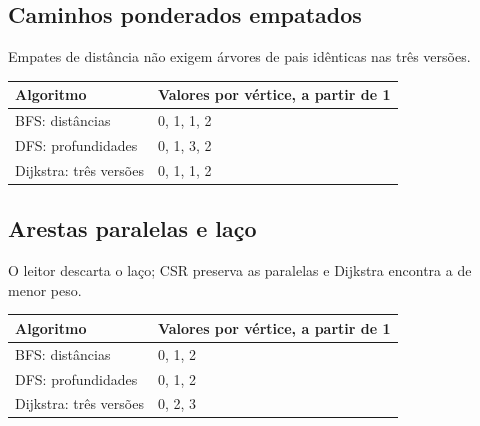 \documentclass[a4paper,12pt]{article}
\begin{document}
\par\noindent\begin{minipage}{\textwidth}\subsection{Caminhos ponderados empatados}
Empates de distância não exigem árvores de pais idênticas nas três versões.
\par\smallskip\noindent\begin{minipage}{\textwidth}\centering
\begingroup\small
\setlength{\tabcolsep}{4pt}
\begin{tabular}{l>{\raggedright\arraybackslash}p{10.4cm}}
\toprule
Algoritmo & Valores por vértice, a partir de 1 \\
\midrule
BFS: distâncias & \num{0}, \num{1}, \num{1}, \num{2} \\
DFS: profundidades & \num{0}, \num{1}, \num{3}, \num{2} \\
Dijkstra: três versões & \num{0}, \num{1}, \num{1}, \num{2} \\
\bottomrule
\end{tabular}
\endgroup
\end{minipage}\par\smallskip
\end{minipage}\par\medskip
\par\noindent\begin{minipage}{\textwidth}\subsection{Arestas paralelas e laço}
O leitor descarta o laço; CSR preserva as paralelas e Dijkstra encontra a de menor peso.
\par\smallskip\noindent\begin{minipage}{\textwidth}\centering
\begingroup\small
\setlength{\tabcolsep}{4pt}
\begin{tabular}{l>{\raggedright\arraybackslash}p{10.4cm}}
\toprule
Algoritmo & Valores por vértice, a partir de 1 \\
\midrule
BFS: distâncias & \num{0}, \num{1}, \num{2} \\
DFS: profundidades & \num{0}, \num{1}, \num{2} \\
Dijkstra: três versões & \num{0}, \num{2}, \num{3} \\
\bottomrule
\end{tabular}
\endgroup
\end{minipage}\par\smallskip
\end{minipage}\par\medskip
\end{document}
